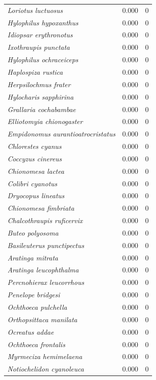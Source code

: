 \documentclass[12pt,a4paper]{article}
\begin{document}
\begin{longtable}{p{6.2cm}cr}
  \textit{Loriotus luctuosus} & 0.000 & 0 \\
  \textit{Hylophilus hypoxanthus} & 0.000 & 0 \\
  \textit{Idiopsar erythronotus} & 0.000 & 0 \\
  \textit{Ixothraupis punctata} & 0.000 & 0 \\
  \textit{Hylophilus ochraceiceps} & 0.000 & 0 \\
  \textit{Haplospiza rustica} & 0.000 & 0 \\
  \textit{Herpsilochmus frater} & 0.000 & 0 \\
  \textit{Hylocharis sapphirina} & 0.000 & 0 \\
  \textit{Grallaria cochabambae} & 0.000 & 0 \\
  \textit{Elliotomyia chionogaster} & 0.000 & 0 \\
  \textit{Empidonomus aurantioatrocristatus} & 0.000 & 0 \\
  \textit{Chlorestes cyanus} & 0.000 & 0 \\
  \textit{Coccyzus cinereus} & 0.000 & 0 \\
  \textit{Chionomesa lactea} & 0.000 & 0 \\
  \textit{Colibri cyanotus} & 0.000 & 0 \\
  \textit{Dryocopus lineatus} & 0.000 & 0 \\
  \textit{Chionomesa fimbriata} & 0.000 & 0 \\
  \textit{Chalcothraupis ruficervix} & 0.000 & 0 \\
  \textit{Buteo polyosoma} & 0.000 & 0 \\
  \textit{Basileuterus punctipectus} & 0.000 & 0 \\
  \textit{Aratinga mitrata} & 0.000 & 0 \\
  \textit{Aratinga leucophthalma} & 0.000 & 0 \\
  \textit{Percnohierax leucorrhous} & 0.000 & 0 \\
  \textit{Penelope bridgesi} & 0.000 & 0 \\
  \textit{Ochthoeca pulchella} & 0.000 & 0 \\
  \textit{Orthopsittaca manilata} & 0.000 & 0 \\
  \textit{Ocreatus addae} & 0.000 & 0 \\
  \textit{Ochthoeca frontalis} & 0.000 & 0 \\
  \textit{Myrmeciza hemimelaena} & 0.000 & 0 \\
  \textit{Notiochelidon cyanoleuca} & 0.000 & 0 \\

\end{longtable}
\end{document}
